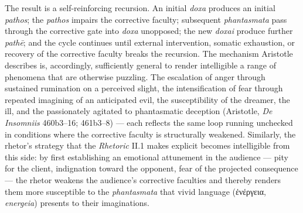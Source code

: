 The result is a self-reinforcing recursion. An initial \textit{doxa} produces an initial \textit{pathos}; the \textit{pathos} impairs the corrective faculty; subsequent \textit{phantasmata} pass through the corrective gate into \textit{doxa} unopposed; the new \textit{doxai} produce further \textit{path\=e}; and the cycle continues until external intervention, somatic exhaustion, or recovery of the corrective faculty breaks the recursion. The mechanism Aristotle describes is, accordingly, sufficiently general to render intelligible a range of phenomena that are otherwise puzzling. The escalation of anger through sustained rumination on a perceived slight, the intensification of fear through repeated imagining of an anticipated evil, the susceptibility of the dreamer, the ill, and the passionately agitated to phantasmatic deception (Aristotle, \textit{De Insomniis} 460b3--16; 461b3--8) --- each reflects the same loop running unchecked in conditions where the corrective faculty is structurally weakened. Similarly, the rhetor's strategy that the \textit{Rhetoric} II.1 makes explicit becomes intelligible from this side: by first establishing an emotional attunement in the audience --- pity for the client, indignation toward the opponent, fear of the projected consequence --- the rhetor weakens the audience's corrective faculties and thereby renders them more susceptible to the \textit{phantasmata} that vivid language (ἐνέργεια, \textit{energeia}) presents to their imaginations.

